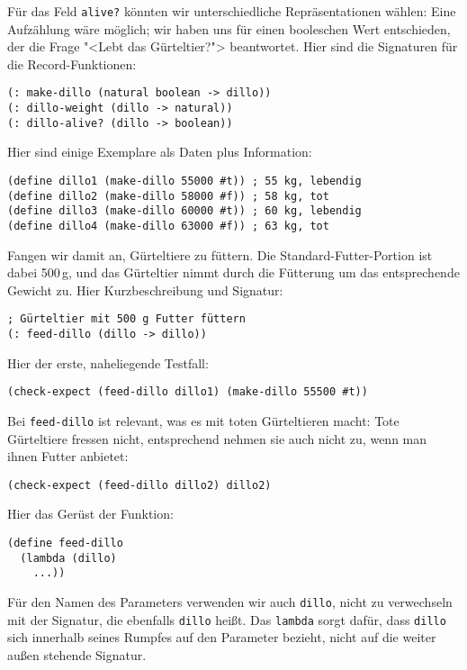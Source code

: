 Für das Feld \lstinline{alive?} könnten wir unterschiedliche Repräsentationen
wählen: Eine Aufzählung wäre möglich; wir haben uns für einen
booleschen Wert entschieden, der die Frage "<Lebt das Gürteltier?">
beantwortet.  Hier sind die Signaturen für die Record-Funktionen:
%
\begin{lstlisting}
(: make-dillo (natural boolean -> dillo))
(: dillo-weight (dillo -> natural))
(: dillo-alive? (dillo -> boolean))
\end{lstlisting}
%
Hier sind einige Exemplare als Daten plus Information:
%
\begin{lstlisting}
(define dillo1 (make-dillo 55000 #t)) ; 55 kg, lebendig 
(define dillo2 (make-dillo 58000 #f)) ; 58 kg, tot
(define dillo3 (make-dillo 60000 #t)) ; 60 kg, lebendig
(define dillo4 (make-dillo 63000 #f)) ; 63 kg, tot
\end{lstlisting}
%
Fangen wir damit an, Gürteltiere zu füttern.  Die
Standard-Futter-Portion ist dabei 500\,g, und das Gürteltier nimmt durch
die Fütterung um das entsprechende Gewicht zu.  Hier Kurzbeschreibung
und Signatur:
%
\begin{lstlisting}
; Gürteltier mit 500 g Futter füttern
(: feed-dillo (dillo -> dillo))
\end{lstlisting}
%
Hier der erste, naheliegende Testfall:
%
\begin{lstlisting}
(check-expect (feed-dillo dillo1) (make-dillo 55500 #t))
\end{lstlisting}
%
Bei \lstinline{feed-dillo} ist relevant, was es mit toten
Gürteltieren macht: Tote Gürteltiere fressen nicht, entsprechend
nehmen sie auch nicht zu, wenn man ihnen Futter anbietet:
%
\begin{lstlisting}
(check-expect (feed-dillo dillo2) dillo2)
\end{lstlisting}
%
Hier das Gerüst der Funktion:
\begin{lstlisting}
(define feed-dillo
  (lambda (dillo)
    ...))
\end{lstlisting}
%
Für den Namen des Parameters verwenden wir auch \lstinline{dillo}, nicht
zu verwechseln mit der Signatur, die ebenfalls \lstinline{dillo} heißt. Das
\lstinline{lambda} sorgt dafür, dass \lstinline{dillo} sich innerhalb seines
Rumpfes auf den Parameter bezieht, nicht auf die weiter außen
stehende Signatur.


